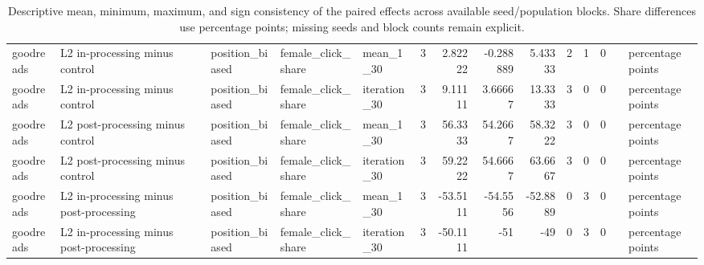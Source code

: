 \begin{table}[htbp!]
\begin{tabular}{lllllrrrrrrrll}
goodreads & L2 in-processing minus control & position\_biased & female\_click\_share & mean\_1\_30 & 3 & 2.82222 & -0.288889 & 5.43333 & 2 & 1 & 0 &  & percentage points \\
goodreads & L2 in-processing minus control & position\_biased & female\_click\_share & iteration\_30 & 3 & 9.11111 & 3.66667 & 13.3333 & 3 & 0 & 0 &  & percentage points \\
goodreads & L2 post-processing minus control & position\_biased & female\_click\_share & mean\_1\_30 & 3 & 56.3333 & 54.2667 & 58.3222 & 3 & 0 & 0 &  & percentage points \\
goodreads & L2 post-processing minus control & position\_biased & female\_click\_share & iteration\_30 & 3 & 59.2222 & 54.6667 & 63.6667 & 3 & 0 & 0 &  & percentage points \\
goodreads & L2 in-processing minus post-processing & position\_biased & female\_click\_share & mean\_1\_30 & 3 & -53.5111 & -54.5556 & -52.8889 & 0 & 3 & 0 &  & percentage points \\
goodreads & L2 in-processing minus post-processing & position\_biased & female\_click\_share & iteration\_30 & 3 & -50.1111 & -51 & -49 & 0 & 3 & 0 &  & percentage points \\
\hline
\end{tabular}
\caption{Descriptive mean, minimum, maximum, and sign consistency of the paired effects across available seed/population blocks. Share differences use percentage points; missing seeds and block counts remain explicit.}
\label{chap:results:tab:rq7_seed_consistency_female_click_share}
\end{table}
